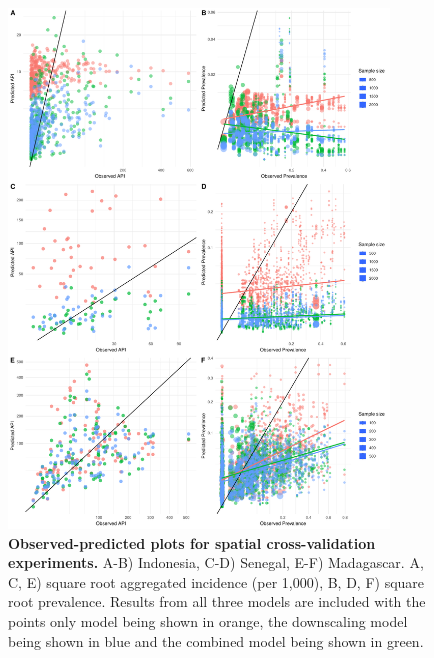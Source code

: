 \documentclass[10pt,letterpaper]{article}
\begin{document}
\begin{figure}[!h]
\includegraphics[width = 0.9\textwidth]{figures/spatial_cv_scatter.pdf} %
\caption{{\bf Observed-predicted plots for spatial cross-validation experiments.}
A-B) Indonesia, C-D) Senegal, E-F) Madagascar. A, C, E) square root aggregated incidence (per 1,000), B, D, F) square root prevalence.
Results from all three models are included with the points only model being shown in orange, the downscaling model being shown in blue and the combined model being shown in green.
}
\label{predobsscatter}
\end{figure}
\end{document}

